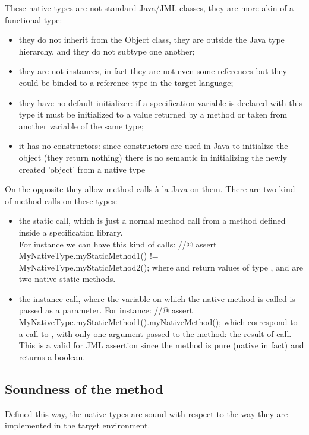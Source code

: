 These native types are not standard Java/JML classes, they are more akin of a functional type:
\begin{itemize}
\item they do not inherit from the Object class, they are outside the Java type hierarchy, and they do not
subtype one another;
\item they are not instances, in fact they are not even some references but 
they could be binded to a reference type in the target language;
\item they have no default initializer: if a specification variable is declared with this type it must
be initialized to a value returned by a method or taken from another variable of the same type;
\item it has no constructors: since constructors are used in Java to initialize the object (they return 
nothing) there is no semantic in initializing the newly created 'object' from a native type
\end{itemize}
On the opposite they allow method calls \`a la Java on them. There are two kind of method
calls on these types:
\begin {itemize}
\item the static call, which is just a normal method call from a method defined 
inside a specification library.\\
For instance we can have this kind of calls:
\btab
//@ assert MyNativeType.my\=StaticMethod1() !=\\ \>MyNativeType.myStaticMethod2();
\etab
where  and   return  values of type , 
and are two native static methods.
\item the instance call, where the variable on which the native method is called is passed as a 
parameter. For instance:
\btab
//@ assert MyNativeType.myStaticMethod1().myNativeMethod();
\etab
which correspond to a call to , with only one argument passed to the method: the
result of  call. This is a valid for JML assertion since the method 
 is
pure (native in fact) and returns a boolean.
\end{itemize}
\subsection{Soundness of the method}
Defined this way, the native types are sound with respect to the way they are implemented in the 
target environment. 

